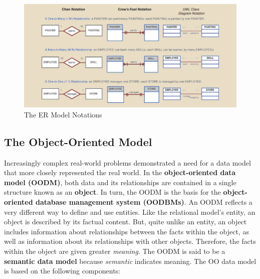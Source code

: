\documentclass[a4paper, 12pt, titlepage]{report}
\begin{document}
\begin{figure}[H]
\centering
\includegraphics[scale=0.3]{ERNot}
\caption{The ER Model Notations}
\end{figure}
\subsection{The Object-Oriented Model}
Increasingly complex real-world problems demonstrated a need for a data model that more closely represented the real world. In the \textbf{object-oriented data model (OODM)}, both data and its relationships are contained in a single structure known as an \textbf{object}. In turn, the OODM is the basis for the \textbf{object-oriented database management system (OODBMs)}. An OODM reflects a very different way to define and use entities. Like the relational model’s entity, an object is described by its factual content. But, quite unlike an entity, an object includes information about relationships between the facts within the object, as well as information about its relationships with other objects. Therefore, the facts within the object are given greater \emph{meaning}. The OODM is said to be a \textbf{semantic data model} because \emph{semantic} indicates meaning.
The OO data model is based on the following components:
\end{document}
